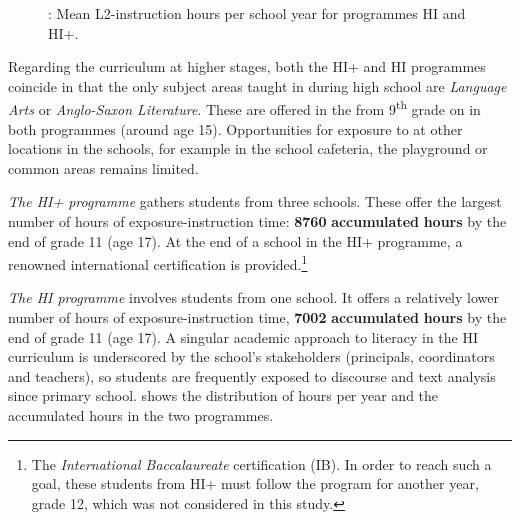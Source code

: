 \documentclass[output=paper]{langsci/langscibook}
\begin{document}
\begin{figure} [t]
\caption{\label{fig:tejada:1}: Mean L2-instruction hours per school year for programmes HI and HI+.}  
\end{figure}

Regarding the curriculum at higher stages, both the HI+ and HI programmes coincide in that the only subject areas taught in  during high school are \textit{ Language Arts} or \textit{Anglo-Saxon Literature}. These are offered in the  from 9\textsuperscript{th} grade on in both programmes (around age 15). Opportunities for exposure to  at other locations in the schools, for example in the school cafeteria, the playground or common areas remains limited. 

\largerpage
\textit{The HI+ programme} gathers students from three schools. These offer the largest number of hours of  exposure-instruction time: \textbf{8760} \textbf{accumulated} \textbf{hours} by the end of grade 11 (age 17). At the end of a school in the HI+ programme, a renowned international certification is provided.\footnote{The \textit{International Baccalaureate} certification (IB). In order to reach such a goal, these students from HI+ must follow the program for another year, grade 12, which was not considered in this study.}

\textit{The HI programme} involves students from one school. It offers a relatively lower number of hours of  exposure-instruction time, \textbf{7002} \textbf{accumulated} \textbf{hours} by the end of grade 11 (age 17). A singular academic approach to literacy in the HI curriculum is underscored by the school’s stakeholders (principals, coordinators and teachers), so students are frequently exposed to discourse and text analysis since primary school.  shows the distribution of hours per year and the accumulated hours in the two programmes. 
\end{document}
